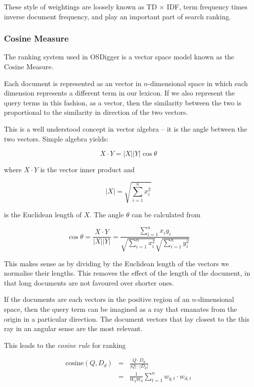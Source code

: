These style of weightings are loosely known as TD $\times$ IDF, term frequency times inverse document frequency, and play an important part of search ranking.

\subsubsection{Cosine Measure}
The ranking system used in OSDigger is a vector space model known as the Cosine Measure.

Each document is represented as an vector in $n$-dimensional space in which each dimension represents a different term in our lexicon.  If we also represent the query terms in this fashion, as a vector, then the similarity between the two is proportional to the similarity in direction of the two vectors.

This is a well understood concept in vector algebra -- it is the angle between the two vectors.  Simple algebra yields:

\[
X \cdot Y = |X| |Y| \cos \theta
\]

where $X \cdot Y$ is the vector inner product and

\[
|X| = \sqrt{\sum^n_{i=1} x^2_i}
\]

is the Euclidean length of $X$.  The angle $\theta$ can be calculated from

\[
\cos \theta = \frac{X \cdot Y}{|X| |Y|} = \frac{\sum^n_{i=1} x_i y_i}{\sqrt{\sum^n_{i=1} x^2_i} \sqrt{\sum^n_{i=1} y^2_i}}
\]

This makes sense as by dividing by the Euclidean length of the vectors we normalise their lengths.  This removes the effect of the length of the document, in that long documents are not favoured over shorter ones.

If the documents are each vectors in the positive region of an $n$-dimensional space, then the query term can be imagined as a ray that emanates from the origin in a particular direction.  The document vectors that lay closest to the this ray in an angular sense are the most relevant.

This leads to the \emph{cosine rule} for ranking

\begin{eqnarray*}
  \textrm{cosine}(Q,D_d) & = & \frac{Q \cdot D_d}{|Q| \cdot |D_d|} \\
                         & = & \frac{1}{W_q W_d}\sum^n_{t=1} w_{q,t} \cdot w_{d,t} \\
\end{eqnarray*}

